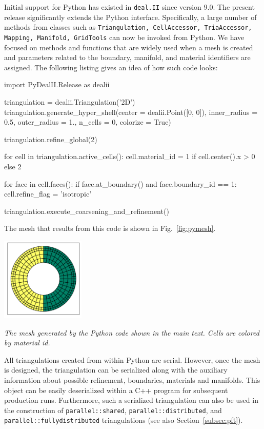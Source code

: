 \documentclass{ansarticle-preprint}
\newcommand{\specialword}[1]{\texttt{#1}}
\newcommand{\dealii}{{\specialword{deal.II}}\xspace}
\begin{document}
Initial support for Python has existed in \dealii{} since version
9.0. The present release significantly extends the Python
interface. Specifically, a large number of methods from classes such
as \texttt{Triangulation, CellAccessor, TriaAccessor, Mapping,
  Manifold, GridTools} can now be invoked from Python. We have focused
on methods and functions that are widely used when a mesh is created
and parameters related to the boundary, manifold, and material
identifiers are assigned. The following listing gives an idea of how
such code looks:
\begin{python}
import PyDealII.Release as dealii

triangulation = dealii.Triangulation('2D')
triangulation.generate_hyper_shell(center = dealii.Point([0, 0]),
                                   inner_radius = 0.5, outer_radius = 1.,
                                   n_cells = 0, colorize = True)

triangulation.refine_global(2)

for cell in triangulation.active_cells():
    cell.material_id = 1 if cell.center().x > 0 else 2

    for face in cell.faces():
        if face.at_boundary() and face.boundary_id == 1:
            cell.refine_flag = 'isotropic'

triangulation.execute_coarsening_and_refinement()
\end{python}
The mesh that results from this code is shown in Fig.~\ref{fig:pymesh}.

\begin{floatingfigure}[r]{0.3\textwidth}
  \centering
  \vspace*{-1.4cm}
  \includegraphics[width=0.3\textwidth]{python_mesh.png}
  \vspace*{-5mm}
  \caption{\it The mesh generated by the Python code shown in the main
    text. Cells are colored by material id.}
  \vspace*{0.2cm}
  \label{fig:pymesh}
\end{floatingfigure}
All triangulations created from within Python are serial. However,
once the mesh is designed, the triangulation can be serialized along
with the auxiliary information about possible refinement, boundaries,
materials and manifolds. This object can be easily deserialized within
a C++ program for subsequent production runs. Furthermore, such a
serialized triangulation can also be used in the construction of
\texttt{parallel::shared}, \texttt{parallel::distributed}, and
\texttt{parallel::fullydistributed} triangulations (see also Section~\ref{subsec:pft}).
\end{document}
